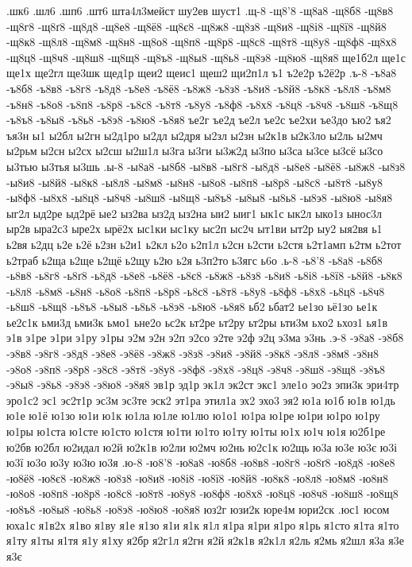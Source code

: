 {{.шк6
.шл6
.шп6
.шт6
шта4л3мейст
шу2ев
шуст1
.щ-8
-щ8'8
-щ8а8
-щ8б8
-щ8в8
-щ8г8
-щ8ґ8
-щ8д8
-щ8е8
-щ8ё8
-щ8є8
-щ8ж8
-щ8з8
-щ8и8
-щ8і8
-щ8ї8
-щ8й8
-щ8к8
-щ8л8
-щ8м8
-щ8н8
-щ8о8
-щ8п8
-щ8р8
-щ8с8
-щ8т8
-щ8у8
-щ8ф8
-щ8х8
-щ8ц8
-щ8ч8
-щ8ш8
-щ8щ8
-щ8ъ8
-щ8ы8
-щ8ь8
-щ8э8
-щ8ю8
-щ8я8
ще1б2л
ще1с
ще1х
ще2гл
ще3шк
щед1р
щеи2
щеис1
щеш2
щи2п1л
ъ1
ъ2е2р
ъ2ё2р
.ъ-8
-ъ8а8
-ъ8б8
-ъ8в8
-ъ8г8
-ъ8д8
-ъ8е8
-ъ8ё8
-ъ8ж8
-ъ8з8
-ъ8и8
-ъ8й8
-ъ8к8
-ъ8л8
-ъ8м8
-ъ8н8
-ъ8о8
-ъ8п8
-ъ8р8
-ъ8с8
-ъ8т8
-ъ8у8
-ъ8ф8
-ъ8х8
-ъ8ц8
-ъ8ч8
-ъ8ш8
-ъ8щ8
-ъ8ъ8
-ъ8ы8
-ъ8ь8
-ъ8э8
-ъ8ю8
-ъ8я8
ъе2г
ъе2д
ъе2л
ъе2с
ъе2хи
ъе3до
ъю2
ъя2
ъя3н
ы1
ы2бл
ы2гн
ы2д1ро
ы2дл
ы2дря
ы2зл
ы2зн
ы2к1в
ы2к3ло
ы2ль
ы2мч
ы2рьм
ы2сн
ы2сх
ы2сш
ы2ш1л
ы3га
ы3ги
ы3ж2д
ы3по
ы3са
ы3се
ы3сё
ы3со
ы3тью
ы3тья
ы3шь
.ы-8
-ы8а8
-ы8б8
-ы8в8
-ы8г8
-ы8д8
-ы8е8
-ы8ё8
-ы8ж8
-ы8з8
-ы8и8
-ы8й8
-ы8к8
-ы8л8
-ы8м8
-ы8н8
-ы8о8
-ы8п8
-ы8р8
-ы8с8
-ы8т8
-ы8у8
-ы8ф8
-ы8х8
-ы8ц8
-ы8ч8
-ы8ш8
-ы8щ8
-ы8ъ8
-ы8ы8
-ы8ь8
-ы8э8
-ы8ю8
-ы8я8
ыг2л
ыд2ре
ыд2рё
ые2
ыз2ва
ыз2д
ыз2на
ыи2
ыиг1
ык1с
ык2л
ыко1з
ынос3л
ыр2в
ыра2с3
ыре2х
ырё2х
ыс1ки
ыс1ку
ыс2п
ыс2ч
ыт1ви
ыт2р
ыу2
ыя2вя
ь1
ь2вя
ь2дц
ь2е
ь2ё
ь2зн
ь2и1
ь2кл
ь2о
ь2п1л
ь2сн
ь2сти
ь2стя
ь2т1амп
ь2тм
ь2тот
ь2траб
ь2ща
ь2ще
ь2щё
ь2щу
ь2ю
ь2я
ь3п2то
ь3ягс
ь6о
.ь-8
-ь8'8
-ь8а8
-ь8б8
-ь8в8
-ь8г8
-ь8ґ8
-ь8д8
-ь8е8
-ь8ё8
-ь8є8
-ь8ж8
-ь8з8
-ь8и8
-ь8і8
-ь8ї8
-ь8й8
-ь8к8
-ь8л8
-ь8м8
-ь8н8
-ь8о8
-ь8п8
-ь8р8
-ь8с8
-ь8т8
-ь8у8
-ь8ф8
-ь8х8
-ь8ц8
-ь8ч8
-ь8ш8
-ь8щ8
-ь8ъ8
-ь8ы8
-ь8ь8
-ь8э8
-ь8ю8
-ь8я8
ьб2
ьбат2
ье1зо
ьё1зо
ье1к
ье2с1к
ьми3д
ьми3к
ьмо1
ьне2о
ьс2к
ьт2ре
ьт2ру
ьт2ры
ьти3м
ьхо2
ьхоз1
ья1в
э1в
э1ре
э1ри
э1ру
э1ры
э2м
э2н
э2п
э2со
э2те
э2ф
э2ц
э3ма
э3нь
.э-8
-э8а8
-э8б8
-э8в8
-э8г8
-э8д8
-э8е8
-э8ё8
-э8ж8
-э8з8
-э8и8
-э8й8
-э8к8
-э8л8
-э8м8
-э8н8
-э8о8
-э8п8
-э8р8
-э8с8
-э8т8
-э8у8
-э8ф8
-э8х8
-э8ц8
-э8ч8
-э8ш8
-э8щ8
-э8ъ8
-э8ы8
-э8ь8
-э8э8
-э8ю8
-э8я8
эв1р
эд1р
эк1л
эк2ст
экс1
эле1о
эо2з
эпи3к
эри4тр
эро1с2
эс1
эс2т1р
эс3м
эс3те
эск2
эт1ра
этил1а
эх2
эхо3
эя2
ю1а
ю1б
ю1в
ю1дь
ю1е
ю1ё
ю1зо
ю1и
ю1к
ю1ла
ю1ле
ю1лю
ю1о1
ю1ра
ю1ре
ю1ри
ю1ро
ю1ру
ю1ры
ю1ста
ю1сте
ю1сто
ю1стя
ю1ти
ю1то
ю1ту
ю1ты
ю1х
ю1ч
ю1я
ю2б1ре
ю2бв
ю2бл
ю2идал
ю2й
ю2к1в
ю2ли
ю2мч
ю2нь
ю2с1к
ю2щь
ю3а
ю3е
ю3є
ю3і
ю3ї
ю3о
ю3у
ю3ю
ю3я
.ю-8
-ю8'8
-ю8а8
-ю8б8
-ю8в8
-ю8г8
-ю8ґ8
-ю8д8
-ю8е8
-ю8ё8
-ю8є8
-ю8ж8
-ю8з8
-ю8и8
-ю8і8
-ю8ї8
-ю8й8
-ю8к8
-ю8л8
-ю8м8
-ю8н8
-ю8о8
-ю8п8
-ю8р8
-ю8с8
-ю8т8
-ю8у8
-ю8ф8
-ю8х8
-ю8ц8
-ю8ч8
-ю8ш8
-ю8щ8
-ю8ъ8
-ю8ы8
-ю8ь8
-ю8э8
-ю8ю8
-ю8я8
юз2г
юзи2к
юре4м
юри2ск
.юс1
юсом
юха1с
я1в2х
я1во
я1ву
я1е
я1зо
я1и
я1к
я1л
я1ра
я1ри
я1ро
я1рь
я1сто
я1та
я1то
я1ту
я1ты
я1тя
я1у
я1ху
я2бр
я2г1л
я2гн
я2й
я2к1в
я2к1л
я2ль
я2мь
я2шл
я3а
я3е
я3є
}}
